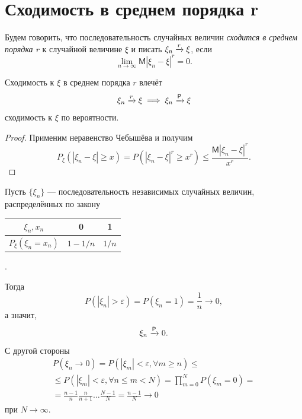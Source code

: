 \section{Сходимость в среднем порядка r}
\begin{definition}
	Будем говорить, что последовательность случайных величин \emph{сходится в
	среднем порядка $ r $} к случайной величине $ \xi $ и писать $ \xi_n \xrightarrow[]{r} \xi
	$, если  
	\[
	\lim_{n\to\infty}\mathsf M |\xi_n - \xi|^r = 0.
	\]
	
\end{definition}

\begin{utv}
	Сходимость к $ \xi $ в среднем порядка $ r $ влечёт
	\[
		\xi_n\xrightarrow[]{r}\xi \implies \xi_n \xrightarrow[]{\mathsf P} \xi
	\]
	сходимость к $ \xi $ по вероятности.
\end{utv}
\begin{proof}
	Применим неравенство Чебышёва и получим 
	\[
			P_\xi(|\xi_n - \xi| \geqslant x) = P (|\xi_n - \xi|^r \geqslant x^r )
			\leqslant \frac{\mathsf M |\xi_n - \xi|^r}{x^r}.
	\]
\end{proof}

\begin{ex}[факультативно]
	Пусть $ \{\xi_n\} $ --- последовательность независимых случайных величин,
	распределённых по закону
  
	{\centering
	\begin{tabular}{|c|c|c|}
		\hline
		$ \xi_n , x_n $ &0 &1 \\\hline
		$ P_\xi(\xi_n = x_n) $ & $ 1 - 1/n $ & $ 1/n $\\\hline
\end{tabular}.}

Тогда  
\[
		P(|\xi_n| > \varepsilon) = P(\xi_n = 1) = \frac{1}{n} \to 0,
\]
а значит, 
\[
		\xi_n \xrightarrow[]{\mathsf P} 0.
\]
С другой стороны
\begin{multline*}
	P(\xi_n \to 0) = P(|\xi_m| < \varepsilon, \forall m \geqslant n) \leqslant \\
	\leqslant P(|\xi_m| < \varepsilon, \forall n \leqslant m < N) = \prod_{m=0}^N
	P(\xi_m = 0) = \\
	= \frac{n-1}{n}\frac{n}{n+1}\ldots
	\frac{N-1}{N} = \frac{n-1}{N} \to 0
\end{multline*}
при $ N \to \infty $.
\end{ex}



